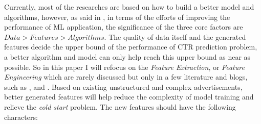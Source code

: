 Currently, most of the researches are based on how to build a better model and algorithms, however, as said in \cite{facebook2015}, in terms of the efforts of improving the performance of ML application, the significance of the three core factors are \(Data > Features > Algorithms\). The quality of data itself and the generated features decide the upper bound of the performance of CTR prediction problem, a better algorithm and model can only help reach this upper bound as near as possible. So in this paper I will refocus on the \textit{Feature Extraction}, or \textit{Feature Engineering} which are rarely discussed but only in a few literature and blogs, such as \cite{featureengineering}, and \cite{featureengineeringmeituan}. Based on existing unstructured and complex advertisements, better generated features will help reduce the complexity of model training and relieve the \textit{cold start} problem. The new features should have the following characters:
